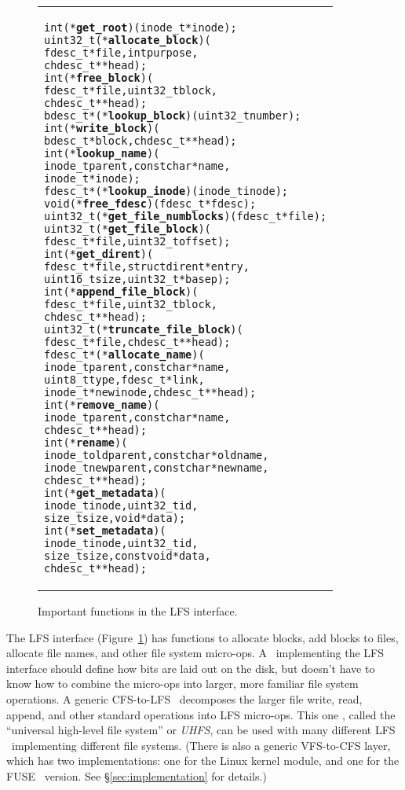 \begin{figure}[htb]
\vskip-14pt
\begin{tabular}{@{\hskip0.25in}p{2in}@{}}
\begin{scriptsize}
\begin{alltt}
int (*\textbf{get_root})(inode_t *inode);
uint32_t (*\textbf{allocate_block})(
    fdesc_t *file, int purpose,
    chdesc_t **head);
int (*\textbf{free_block})(
    fdesc_t *file, uint32_t block,
    chdesc_t **head);
bdesc_t *(*\textbf{lookup_block})(uint32_t number);
int (*\textbf{write_block})(
    bdesc_t *block, chdesc_t **head);
int (*\textbf{lookup_name})(
    inode_t parent, const char *name,
    inode_t *inode);
fdesc_t *(*\textbf{lookup_inode})(inode_t inode);
void (*\textbf{free_fdesc})(fdesc_t *fdesc);
uint32_t (*\textbf{get_file_numblocks})(fdesc_t *file);
uint32_t (*\textbf{get_file_block})(
    fdesc_t *file, uint32_t offset);
int (*\textbf{get_dirent})(
    fdesc_t *file, struct dirent *entry,
    uint16_t size, uint32_t *basep);
int (*\textbf{append_file_block})(
    fdesc_t *file, uint32_t block,
    chdesc_t **head);
uint32_t (*\textbf{truncate_file_block})(
    fdesc_t *file, chdesc_t **head);
fdesc_t *(*\textbf{allocate_name})(
    inode_t parent, const char *name,
    uint8_t type, fdesc_t *link,
    inode_t *newinode, chdesc_t **head);
int (*\textbf{remove_name})(
    inode_t parent, const char *name,
    chdesc_t **head);
int (*\textbf{rename})(
    inode_t oldparent, const char *oldname,
    inode_t newparent, const char *newname,
    chdesc_t **head);
int (*\textbf{get_metadata})(
    inode_t inode, uint32_t id,
    size_t size, void *data);
int (*\textbf{set_metadata})(
    inode_t inode, uint32_t id,
    size_t size, const void *data,
    chdesc_t **head);
\end{alltt}
\end{scriptsize}
\end{tabular}
\vspace{-10pt}
\caption{\label{fig:lfs} Important functions in the LFS interface.}
\end{figure}

The LFS interface (Figure~\ref{fig:lfs}) has functions to allocate blocks, add
blocks to files, allocate file names, and other file system micro-ops. A
\module\ implementing the LFS interface should define how bits are laid out on
the disk, but doesn't have to know how to combine the micro-ops into larger,
more familiar file system operations. A generic CFS-to-LFS \module\ decomposes
the larger file write, read, append, and other standard operations into LFS
micro-ops. This one \module, called the ``universal high-level file system''
or \emph{UHFS}, can be used with many different LFS \modules\ implementing
different file systems. (There is also a generic VFS-to-CFS layer, which has
two implementations: one for the Linux kernel module, and one for the
FUSE~\cite{fuse} version. See \S\ref{sec:implementation} for details.)

